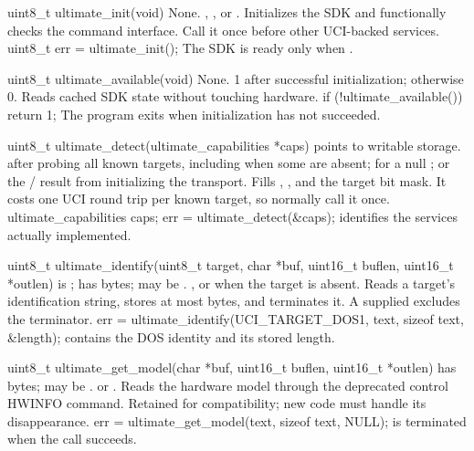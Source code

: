 \begin{referencechapter}
{uint8\_t ultimate\_init(void)}
{None.}
{, , or
.}
{Initializes the SDK and functionally checks the command interface. Call it
once before other UCI-backed services.}
{uint8\_t err = ultimate\_init();}
{The SDK is ready only when .}

{uint8\_t ultimate\_available(void)}
{None.}
{1 after successful initialization; otherwise 0.}
{Reads cached SDK state without touching hardware.}
{if (!ultimate\_available()) return 1;}
{The program exits when initialization has not succeeded.}

{uint8\_t ultimate\_detect(ultimate\_capabilities *caps)}
{ points to writable
\hyperref[struct:ultimate-capabilities]{} storage.}
{ after probing all known targets, including when some are
absent;  for a null ; or the
/ result from
initializing the transport.}
{Fills , , and the target bit mask. It costs one UCI
round trip per known target, so normally call it once.}
{ultimate\_capabilities caps; err = ultimate\_detect(\&caps);}
{ identifies the services actually implemented.}

{uint8\_t ultimate\_identify(uint8\_t target, char *buf, uint16\_t buflen, uint16\_t *outlen)}
{ is ;  has  bytes;
 may be .}
{, or  when the target is
absent.}
{Reads a target's identification string, stores at most  bytes,
and terminates it. A supplied  excludes the terminator.}
{err = ultimate\_identify(UCI\_TARGET\_DOS1, text, sizeof text, \&length);}
{ contains the DOS identity and  its stored length.}

{uint8\_t ultimate\_get\_model(char *buf, uint16\_t buflen, uint16\_t *outlen)}
{ has  bytes;  may be .}
{ or .}
{Reads the hardware model through the deprecated control HWINFO command.
Retained for compatibility; new code must handle its disappearance.}
{err = ultimate\_get\_model(text, sizeof text, NULL);}
{ is terminated when the call succeeds.}


\end{referencechapter}
